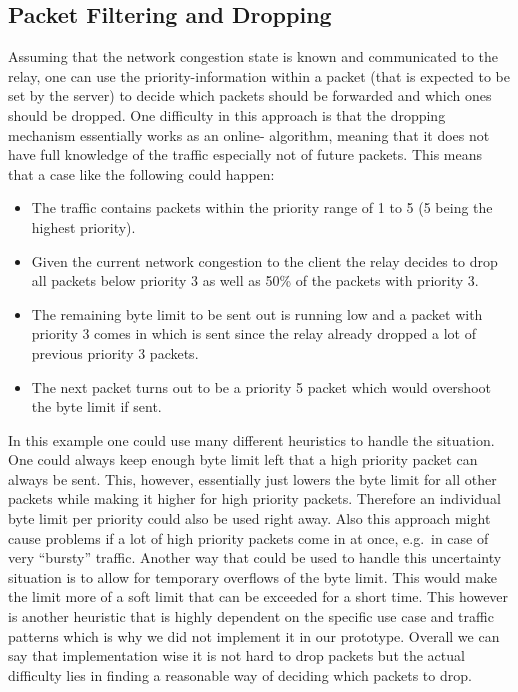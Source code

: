 \subsection{Packet Filtering and Dropping} %
Assuming that the network congestion state is known and communicated to the relay, one can 
use the priority-information within a packet (that is expected to be set by the server) to
decide which packets should be forwarded and which ones should be dropped.
One difficulty in this approach is that the dropping mechanism essentially works as an online-
algorithm, meaning that it does not have full knowledge of the traffic especially not of 
future packets.
This means that a case like the following could happen:
\begin{itemize}
    \item The traffic contains packets within the priority range of 1 to 5 (5 being the highest priority).
    \item Given the current network congestion to the client the relay decides to drop 
            all packets below priority 3 as well as 50\% of the packets with priority 3.
    \item The remaining byte limit to be sent out is running low and a packet with priority 3 
            comes in which is sent since the relay already dropped a lot of previous priority 3 packets.
    \item The next packet turns out to be a priority 5 packet which would overshoot the byte limit if sent.
\end{itemize}
In this example one could use many different heuristics to handle the situation.
One could always keep enough byte limit left that a high priority packet can always be sent.
This, however, essentially just lowers the byte limit for all other packets while making it higher 
for high priority packets.
Therefore an individual byte limit per priority could also be used right away.
Also this approach might cause problems if a lot of high priority packets come in at once, 
e.g.~in case of very ``bursty'' traffic.
Another way that could be used to handle this uncertainty situation is to allow for temporary 
overflows of the byte limit.
This would make the limit more of a soft limit that can be exceeded for a short time.
This however is another heuristic that is highly dependent on the specific use case and
traffic patterns which is why we did not implement it in our prototype.
Overall we can say that implementation wise it is not hard to drop packets but the actual
difficulty lies in finding a reasonable way of deciding which packets to drop.
